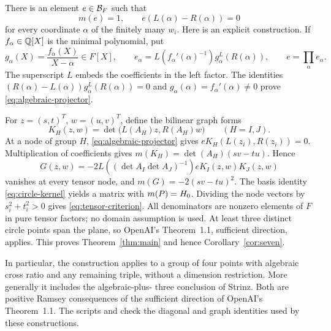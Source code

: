 There is an element $e\in\mathcal B_F$ such that
\begin{equation}\label{eq:algebraic-projector}
 m(e)=1,\qquad e(L(\alpha)-R(\alpha))=0
\end{equation}
for every coordinate $\alpha$ of the finitely many $w_i$.
Here is an explicit construction. If $f_\alpha\in\mathbb Q[X]$ is the
minimal polynomial, put
\[
 g_\alpha(X)=\frac{f_\alpha(X)}{X-\alpha}\in F[X],\qquad
 e_\alpha=L(f_\alpha'(\alpha)^{-1})
                       g_\alpha^L(R(\alpha)),\qquad
 e=\prod_\alpha e_\alpha.
\]
The superscript $L$ embeds the coefficients in the left factor.
The identities
$(R(\alpha)-L(\alpha))g_\alpha^L(R(\alpha))=0$
and $g_\alpha(\alpha)=f_\alpha'(\alpha)\ne0$ prove
\eqref{eq:algebraic-projector}.

For $z=(s,t)^T$, $w=(u,v)^T$, define the bilinear graph forms
\[
 K_H(z,w)=\det\bigl(L(A_H)z,R(A_H)w\bigr)\qquad(H=I,J).
\]
At a node of group $H$, \eqref{eq:algebraic-projector} gives
$eK_H(L(z_i),R(z_i))=0$. Multiplication of coefficients gives
$m(K_H)=\det(A_H)(sv-tu)$. Hence
\begin{equation}\label{eq:two-group-certificate}
 G(z,w)=-2L((\det A_I\det A_J)^{-1})eK_I(z,w)K_J(z,w)
\end{equation}
vanishes at every tensor node, and $m(G)=-2(sv-tu)^2$.
The basis identity \eqref{eq:circle-kernel} yields a matrix with
$m(P)=H_0$. Dividing the node vectors by $s_i^2+t_i^2>0$
gives \eqref{eq:tensor-criterion}. All denominators are nonzero
elements of $F$ in pure tensor factors; no domain assumption is used.
At least three distinct circle points span the plane, so OpenAI's
Theorem~1.1, sufficient direction, applies. This proves
Theorem~\ref{thm:main} and hence Corollary~\ref{cor:seven}.

In particular, the construction applies to a group of four points
with algebraic cross ratio and any remaining triple, without a
dimension restriction. More generally it includes the algebraic-plus-
three conclusion of Strinz. Both are positive Ramsey consequences
of the sufficient direction of OpenAI's Theorem~1.1. The scripts
 and  check the
diagonal and graph identities used by these constructions.
